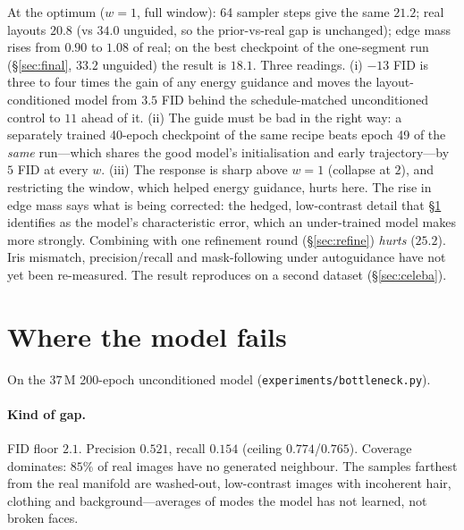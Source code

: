 \documentclass[11pt]{article}
\begin{document}
At the optimum ($w=1$, full window): 64 sampler steps give the same $21.2$; real
layouts $20.8$ (vs $34.0$ unguided, so the prior-vs-real gap is unchanged); edge mass
rises from $0.90$ to $1.08$ of real; on the best checkpoint of the one-segment run
(\S\ref{sec:final}, $33.2$ unguided) the result is $\mathbf{18.1}$. Three readings.
(i) $-13$ FID is three to four times the gain of any energy guidance and moves the
layout-conditioned model from $3.5$ FID behind the schedule-matched unconditioned control
to $11$ ahead of it. (ii) The guide must be bad in the right way: a separately trained
40-epoch checkpoint of the same recipe beats epoch 49 of the \emph{same} run---which
shares the good model's initialisation and early trajectory---by $5$ FID at every $w$.
(iii) The response is sharp above $w=1$ (collapse at $2$), and restricting the window,
which helped energy guidance, hurts here. The rise in edge mass says what is being
corrected: the hedged, low-contrast detail that \S\ref{sec:bottleneck} identifies as the
model's characteristic error, which an under-trained model makes more strongly. Combining
with one refinement round (\S\ref{sec:refine}) \emph{hurts} ($25.2$). Iris mismatch,
precision/recall and mask-following under autoguidance have not yet been re-measured.
The result reproduces on a second dataset (\S\ref{sec:celeba}).

\section{Where the model fails}\label{sec:bottleneck}

On the $37$\,M 200-epoch unconditioned model (\texttt{experiments/bottleneck.py}).

\paragraph{Kind of gap.} FID floor $2.1$. Precision $0.521$, recall $\mathbf{0.154}$
(ceiling $0.774$/$0.765$). Coverage dominates: $85\%$ of real images have no generated
neighbour. The samples farthest from the real manifold are washed-out, low-contrast
images with incoherent hair, clothing and background---averages of modes the model has
not learned, not broken faces.
\end{document}
